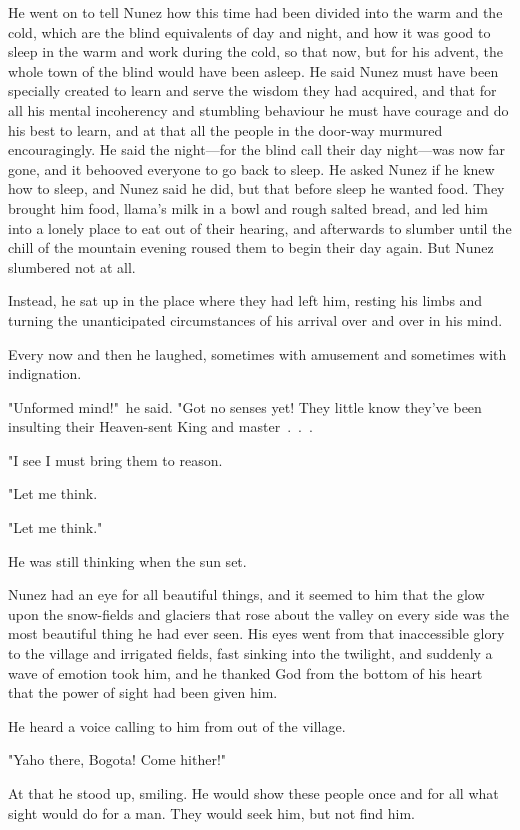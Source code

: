 \documentclass[courier]{sffms}
\begin{document}
He went on to tell Nunez how this time had been divided into the warm
and the cold, which are the blind equivalents of day and night, and
how it was good to sleep in the warm and work during the cold, so that
now, but for his advent, the whole town of the blind would have been
asleep. He said Nunez must have been specially created to learn and
serve the wisdom they had acquired, and that for all his mental
incoherency and stumbling behaviour he must have courage and do his
best to learn, and at that all the people in the door-way murmured
encouragingly. He said the night---for the blind call their day
night---was now far gone, and it behooved everyone to go back to
sleep. He asked Nunez if he knew how to sleep, and Nunez said he did,
but that before sleep he wanted food.  They brought him food, llama's
milk in a bowl and rough salted bread, and led him into a lonely place
to eat out of their hearing, and afterwards to slumber until the chill
of the mountain evening roused them to begin their day again.  But
Nunez slumbered not at all.

Instead, he sat up in the place where they had left him, resting his
limbs and turning the unanticipated circumstances of his arrival over
and over in his mind.

Every now and then he laughed, sometimes with amusement and sometimes
with indignation.

"Unformed mind!"\ he said. "Got no senses yet! They little know they've
been insulting their Heaven-sent King and master~.~.~.

"I see I must bring them to reason.

"Let me think.

"Let me think."

He was still thinking when the sun set.

Nunez had an eye for all beautiful things, and it seemed to him that
the glow upon the snow-fields and glaciers that rose about the valley
on every side was the most beautiful thing he had ever seen. His eyes
went from that inaccessible glory to the village and irrigated fields,
fast sinking into the twilight, and suddenly a wave of emotion took
him, and he thanked God from the bottom of his heart that the power of
sight had been given him.

He heard a voice calling to him from out of the village.

"Yaho there, Bogota! Come hither!"

At that he stood up, smiling. He would show these people once and for
all what sight would do for a man. They would seek him, but not find
him.
\end{document}
